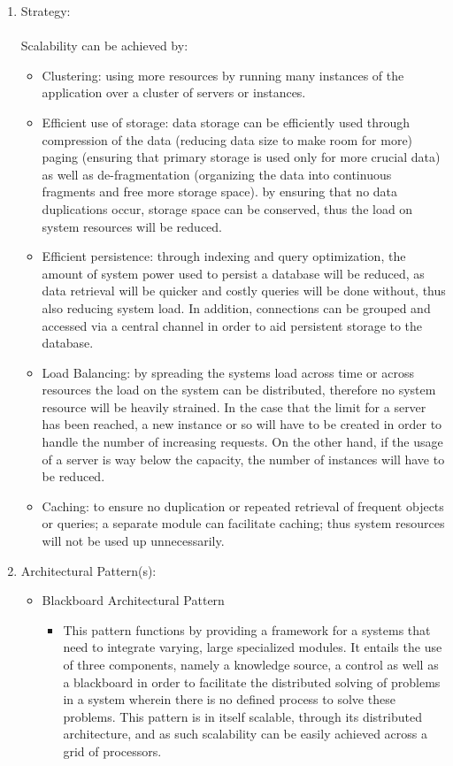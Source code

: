 		\begin{enumerate}
			\item Strategy:\\\\
			Scalability can be achieved by:
			\begin{itemize}
			\item Clustering: using more resources by running many instances of the application over a cluster of servers or instances.
			
			\item Efficient use of storage: data storage can be efficiently used through compression of the data (reducing data size to make room for more) paging (ensuring that primary storage is used only for more crucial data) as well as de-fragmentation (organizing the data into continuous fragments and free more storage space).
			by ensuring that no data duplications occur, storage space can be conserved, thus the load on system resources will be reduced.
			\item Efficient persistence: through indexing and query optimization, the amount of system power used to persist a database will be reduced, as data retrieval will be quicker and costly queries will be done without, thus also reducing system load. In addition, connections can be grouped and accessed via a central channel in order to aid persistent storage to the database.
			
			\item Load Balancing: by spreading the systems load across time or across resources the load on the system can be distributed, therefore no system resource will be heavily strained. In the case that the limit for a server has been reached, a new instance or so will have to be created in order to handle the number of increasing requests. On the other hand, if the usage of a server is way below the capacity, the number of instances will have to be reduced.
			
			\item Caching: to ensure no duplication or repeated retrieval of frequent objects or queries; a separate module can facilitate caching; thus system resources will not be used up unnecessarily.
			 \end{itemize}
			\item Architectural Pattern(s):
			\begin{itemize}
			\item Blackboard Architectural Pattern
				\begin{itemize}
					\item This pattern functions by providing a framework for a systems that need to integrate varying, large specialized modules. It entails the use of three components, namely a knowledge source, a control as well as a blackboard in order to facilitate the distributed solving of problems in a system wherein there is no defined process to solve these problems. This pattern is in itself scalable, through its distributed architecture, and as such scalability can be easily achieved across a grid of processors.				
			\end{itemize}
			 \end{itemize}
			 

\end{enumerate}
